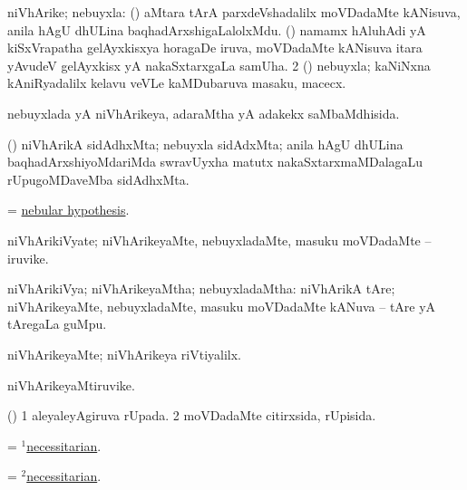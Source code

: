 \bentry
{}
\gl{\nA}
\bmng
\bnum
{} niVhArike; nebuyxla: 
\banum
{} (\Kavi) aMtara tArA parxdeVshadalilx moVDadaMte kANisuva, anila hAgU dhULina baqhadArxshigaLalolxMdu. 
 (\Kavi) namamx hAluhAdi yA kiSxVrapatha gelAyxkisxya horagaDe iruva, moVDadaMte kANisuva itara yAvudeV gelAyxkisx yA nakaSxtarxgaLa samUha. 
\eanum
\numie
\num{2} (\veYshA) nebuyxla; kaNiNxna kAniRyadalilx kelavu veVLe kaMDubaruva masaku, macecx. 
\enum
\emng
\eentry

\bentry
{}
\gl{\gu}
\bmng
nebuyxlada yA niVhArikeya, adaraMtha yA adakekx saMbaMdhisida. 
\emng
\eentry

\bentry
{}
\gl{\nA}
\bmng
(\Kavi) niVhArikA sidAdhxMta; nebuyxla sidAdxMta; anila hAgU dhULina baqhadArxshiyoMdariMda swravUyxha matutx nakaSxtarxmaMDalagaLu rUpugoMDaveMba sidAdhxMta. 
\emng
\eentry

\bentry
{}
\gl{\nA}
\bmng
= \hyperlink{nebular hypothesis}{nebular hypothesis}. 
\emng
\eentry

\bentry
{}
\gl{\nA}
\bmng
niVhArikiVyate; niVhArikeyaMte, nebuyxladaMte, masuku moVDadaMte -- iruvike. 
\emng
\eentry

\bentry
{}
\gl{\gu}
\bmng
niVhArikiVya; niVhArikeyaMtha; nebuyxladaMtha:  niVhArikA tAre; niVhArikeyaMte, nebuyxladaMte, masuku moVDadaMte kANuva -- tAre yA tAregaLa guMpu. 
\emng
\eentry

\bentry
{}
\gl{\kirxvi}
\bmng
niVhArikeyaMte; niVhArikeya riVtiyalilx. 
\emng
\eentry

\bentry
{}
\gl{\nA}
\bmng
niVhArikeyaMtiruvike. 
\emng
\eentry

\bentry
{}
\gl{\gu}
\bmng
(\vaMlAM) 
\bnum
\num{1} aleyaleyAgiruva rUpada. 
\num{2} moVDadaMte citirxsida, rUpisida. 
\enum
\emng
\eentry

\bentry
{}
\gl{\nA}
\bmng
= \hyperlink{necessitarian(1)}{$^1$necessitarian}. 
\emng
\eentry

\bentry
{}
\gl{\gu}
\bmng
= \hyperlink{necessitarian(2)}{$^2$necessitarian}. 
\emng
\eentry

